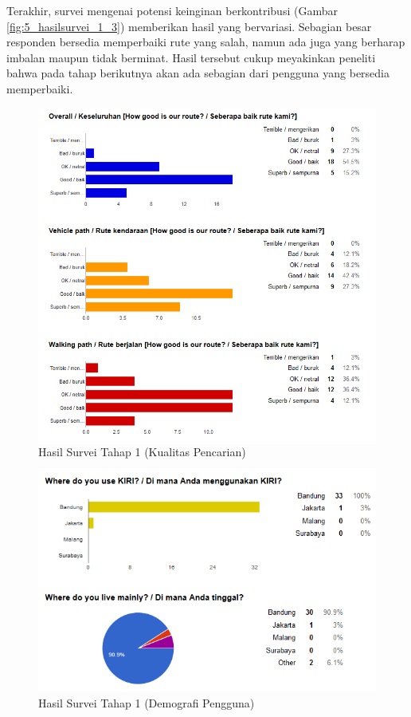 Terakhir, survei mengenai potensi keinginan berkontribusi (Gambar \ref{fig:5_hasilsurvei_1_3}) memberikan hasil yang bervariasi. Sebagian besar responden bersedia memperbaiki rute yang salah, namun ada juga yang berharap imbalan maupun tidak berminat. Hasil tersebut cukup meyakinkan peneliti bahwa pada tahap berikutnya akan ada sebagian dari pengguna yang bersedia memperbaiki.

\begin{figure}
	\centering
	\includegraphics[scale=0.75]{Gambar/5_hasilsurvei_1_1}
	\caption{Hasil Survei Tahap 1 (Kualitas Pencarian)} 
	\label{fig:5_hasilsurvei_1_1}
\end{figure}

\begin{figure}
	\centering
	\includegraphics[scale=0.75]{Gambar/5_hasilsurvei_1_2}
	\caption{Hasil Survei Tahap 1 (Demografi Pengguna)} 
	\label{fig:5_hasilsurvei_1_2}
\end{figure}

